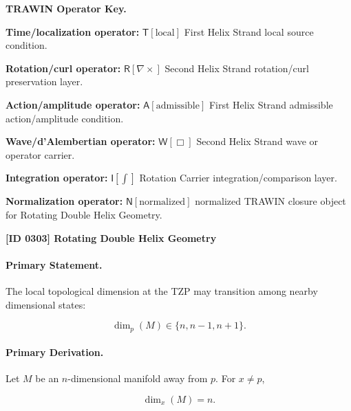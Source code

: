 \par\vspace{0.45\baselineskip}
\noindent\begin{minipage}[t]{\linewidth}
\begingroup
\small
\raggedright
\textbf{TRAWIN Operator Key.}\par
\noindent\textbf{Time/localization operator:} $\mathsf{T}\!\left[\mathrm{local}\right]$ First Helix Strand local source condition.\par
\noindent\textbf{Rotation/curl operator:} $\mathsf{R}\!\left[\nabla\times\right]$ Second Helix Strand rotation/curl preservation layer.\par
\noindent\textbf{Action/amplitude operator:} $\mathsf{A}\!\left[\mathrm{admissible}\right]$ First Helix Strand admissible action/amplitude condition.\par
\noindent\textbf{Wave/d'Alembertian operator:} $\mathsf{W}\!\left[\Box\right]$ Second Helix Strand wave or operator carrier.\par
\noindent\textbf{Integration operator:} $\mathsf{I}\!\left[\int\right]$ Rotation Carrier integration/comparison layer.\par
\noindent\textbf{Normalization operator:} $\mathsf{N}\!\left[\mathrm{normalized}\right]$ normalized TRAWIN closure object for Rotating Double Helix Geometry.\par
\endgroup
\end{minipage}

\clearpage
\noindent\textbf{[ID 0303] Rotating Double Helix Geometry}\par
\vspace{0.35em}
\paragraph{Primary Statement.}
The local topological dimension at the TZP may transition among nearby dimensional states:

\begin{equation}
\dim_p(M)\in\{n,n-1,n+1\}.
\end{equation}

\paragraph{Primary Derivation.}
Let $M$ be an $n$-dimensional manifold away from $p$. For $x\neq p$,

\begin{equation}
\dim_x(M)=n .
\end{equation}

